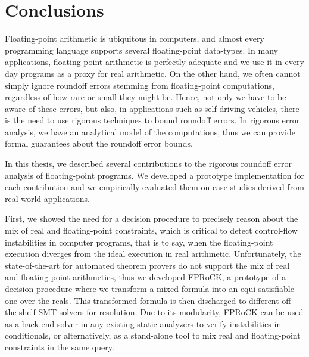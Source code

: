
\chapter{Conclusions}
\label{sec:conclusion}
%
Floating-point arithmetic is ubiquitous in computers, and almost every programming language supports several floating-point data-types.
%
In many applications, floating-point arithmetic is perfectly adequate and we use it in every day programs as a proxy for real arithmetic.
%
On the other hand, we often cannot simply ignore roundoff errors stemming from floating-point computations, regardless of how rare or small they might be.
%
Hence, not only we have to be aware of these errors, but also, in applications such as self-driving vehicles, there is the need to use rigorous techniques to bound roundoff errors. 
%
In rigorous error analysis, we have an analytical model of the computations, thus we can provide formal guarantees about the roundoff error bounds.
%

In this thesis, we described several contributions to the rigorous roundoff error analysis of floating-point programs.
%
We developed a prototype implementation for each contribution and we empirically evaluated them on case-studies derived from real-world applications.
%

First, we showed the need for a decision procedure to precisely reason about the mix of real and floating-point constraints, which is critical to detect control-flow instabilities in computer programs, that is to say, when the floating-point execution diverges from the ideal execution in real arithmetic.
%
Unfortunately, the state-of-the-art for automated theorem provers do not support the mix of real and floating-point arithmetics, thus we developed FPRoCK, a prototype of a decision procedure where we transform a mixed formula
into an equi-satisfiable one over the reals.
%
This transformed formula is then discharged to different off-the-shelf SMT solvers for resolution.
%
%
Due to its modularity, FPRoCK can be used as a back-end solver in any existing static analyzers to verify instabilities in conditionals, or alternatively, as a stand-alone tool to mix real and floating-point constraints in the same query.
%

